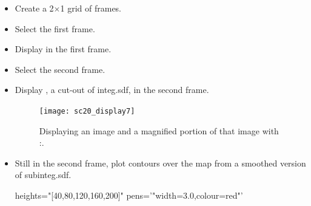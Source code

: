 \documentclass[11pt,oneside,chapters]{starlink}
\begin{document}
\begin{itemize}
\item Create a 2$\times$1 grid of frames.
\begin{terminalv}
\end{terminalv}
\item Select the first frame.
\begin{terminalv}
\end{terminalv}
\item Display  in the first frame.
\begin{terminalv}
\end{terminalv}


\item Select the second frame.
\begin{terminalv}
\end{terminalv}
\item Display , a cut-out of integ.sdf, in the second frame.
\begin{terminalv}
\end{terminalv}

\begin{figure}[h!]
\begin{center}
\texttt{[image: sc20\_display7]}
\caption[Displaying an image and a magnified portion of that image with \Kappa:\display.]{\label{fig:display7}
  Displaying an image and a magnified portion of that image with \Kappa:\display.}
\end{center}
\end{figure}

\item Still in the second frame, plot contours over the map from a smoothed version of subinteg.sdf.
\begin{terminalv}
  heights="[40,80,120,160,200]" pens='"width=3.0,colour=red"'
\end{terminalv}


\end{itemize}
\end{document}
